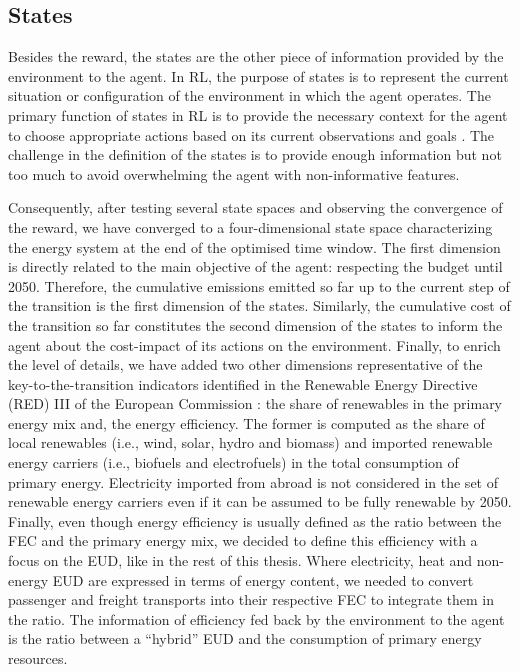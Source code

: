 \documentclass[11pt,twoside,a4paper,english]{article}
\def\ie{i.e., }
\begin{document}
\subsection{States}
\label{subsec:RL:act_states_rew:states}

Besides the reward, the states are the other piece of information provided by the environment to the agent. In \gls{RL}, the purpose of states is to represent the current situation or configuration of the environment in which the agent operates. The primary function of states in RL is to provide the necessary context for the agent to choose appropriate actions based on its current observations and goals \cite{sutton2018reinforcement}. The challenge in the definition of the states is to provide enough information but not too much to avoid overwhelming the agent with non-informative features. 

Consequently, after testing several state spaces and observing the convergence of the reward, we have converged to a four-dimensional state space characterizing the energy system at the end of the optimised time window. The first dimension is directly related to the main objective of the agent: respecting the  budget until 2050. Therefore, the cumulative emissions emitted so far up to the current step of the transition is the first dimension of the states. Similarly, the cumulative cost of the transition so far constitutes the second dimension of the states to inform the agent about the cost-impact of its actions on the environment. Finally, to enrich the level of details, we have added two other dimensions representative of the key-to-the-transition indicators identified in the Renewable Energy Directive (RED) III of the European Commission \cite{REDIII}: the share of renewables in the primary energy mix and, the energy efficiency. The former is computed as the share of local renewables (\ie wind, solar, hydro and biomass) and imported renewable energy carriers (\ie biofuels and electrofuels) in the total consumption of primary energy. Electricity imported from abroad is not considered in the set of renewable energy carriers even if it can be assumed to be fully renewable by 2050. Finally, even though energy efficiency is usually defined as the ratio between the \gls{FEC} and the primary energy mix, we decided to define this efficiency with a focus on the \gls{EUD}, like in the rest of this thesis. Where electricity, heat and non-energy \gls{EUD} are expressed in terms of energy content, we needed to convert passenger and freight transports into their respective \gls{FEC} to integrate them in the ratio. The information of efficiency fed back by the environment to the agent is the ratio between a ``hybrid'' \gls{EUD} and the consumption of primary energy resources.
\end{document}
